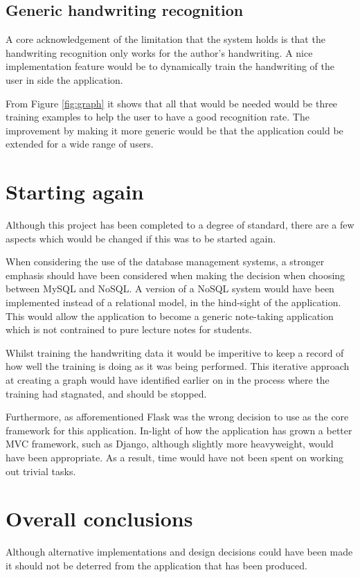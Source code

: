 \subsection{Generic handwriting recognition}
A core acknowledgement of the limitation that the system holds is that the handwriting recognition only works for the author's handwriting. A nice implementation feature would be to dynamically train the handwriting of the user in side the application.

From Figure \ref{fig:graph} it shows that all that would be needed would be three training examples to help the user to have a good recognition rate. The improvement by making it more generic would be that the application could be extended for a wide range of users.


\section{Starting again}
Although this project has been completed to a degree of standard, there are a few aspects which would be changed if this was to be started again.

When considering the use of the database management systems, a stronger emphasis should have been considered when making the decision when choosing between MySQL and NoSQL. A version of a NoSQL system would have been implemented instead of a relational model, in the hind-sight of the application. This would allow the application to become a generic note-taking application which is not contrained to pure lecture notes for students.

Whilst training the handwriting data it would be imperitive to keep a record of how well the training is doing as it was being performed. This iterative approach at creating a graph would have identified earlier on in the process where the training had stagnated, and should be stopped.

Furthermore, as afforementioned Flask was the wrong decision to use as the core framework for this application. In-light of how the application has grown a better MVC framework, such as Django, although slightly more heavyweight, would have been appropriate. As a result, time would have not been spent on working out trivial tasks.


\section{Overall conclusions}
Although alternative implementations and design decisions could have been made it should not be deterred from the application that has been produced.

